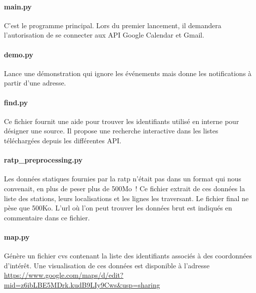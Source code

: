 \documentclass[a4paper, 8pt]{article}
\begin{document}
\paragraph{main.py} C'est le programme principal. Lors du premier lancement,
il demandera l'autorisation de se connecter aux API Google Calendar et Gmail.

\paragraph{demo.py} Lance une démonstration qui ignore les événements mais donne les
notifications à partir d'une adresse.

\paragraph{find.py} Ce fichier fournit une aide
pour trouver les identifiants utilisé en interne pour désigner une source.
Il propose une recherche interactive dans les listes téléchargées depuis les
différentes API.

\paragraph{ratp\_preprocessing.py} Les données statiques fournies par la ratp
n'était pas dans un format qui nous convenait, en plus de peser plus de 500Mo~!
Ce fichier extrait de ces données la liste des stations, leurs localisations et
les lignes les traversant.
Le fichier final ne pèse que 500Ko.
L'url où l'on peut trouver les données brut est indiqués en commentaire dans ce
fichier.

\paragraph{map.py} Génère un fichier cvs contenant la liste des identifiants
associés à des coordonnées d'intérêt.
Une visualisation de ces données est disponible à l'adresse
\url{https://www.google.com/maps/d/edit?mid=z6ibLBE5MDrk.kudB9LIy9Cws&usp=sharing}
\end{document}
